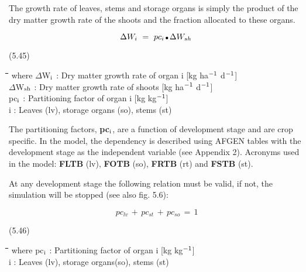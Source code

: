 The growth rate of leaves, stems and storage organs is simply the product of the dry
matter growth rate of the shoots and the fraction allocated to these organs.

\begin{displaymath}
\Delta W _{i} ~=~ pc _{i} \, {\rm \Bullet{0.75ex}}\, \Delta W _{sh} 
\end{displaymath}

 
\strut\hfill (5.45)
\nwln
\begin{tabbing}
\hspace{1.27cm}\=\hspace{1.27cm}\=\hspace{1.27cm}\=\hspace{1.27cm}\=%
\hspace{1.27cm}\=\hspace{1.27cm}\=\hspace{1.27cm}\=\hspace{1.27cm}\=%
\hspace{1.27cm}\=\hspace{1.27cm}\=\kill
where $\Delta$W$_{{\rm i}}$ : Dry matter growth rate of organ i        [kg ha$^{{\rm -1}}$ d$^{{\rm -1}}$]\\
$\Delta$W$_{{\rm sh}}$ : Dry matter growth rate of shoots        [kg ha$^{{\rm -1}}$ d$^{{\rm -1}}$]\\
pc$_{{\rm i}}$ : Partitioning factor of organ i        [kg kg$^{{\rm -1}}$]\\
i : Leaves (lv), storage organs (so), stems (st)
\end{tabbing}

 The partitioning factors, {\bf pc$_{{\rm i}}$}, are a function of development stage and are crop specific. In
the model, the dependency is described using AFGEN tables with the development stage
as the independent variable (see Appendix 2). Acronyms used in the model: {\bf FLTB} (lv),
{\bf FOTB} (so), {\bf FRTB} (rt) and {\bf FSTB} (st).



At any development stage the following relation must be valid, if not, the simulation will
be stopped (see also fig. 5.6):

\begin{displaymath}
\, pc _{lv} \, +\, pc _{st} \, +\, pc _{so} \, =\, 1
\end{displaymath}


\strut\hfill (5.46)
\nwln
\begin{tabbing}
\hspace{1.27cm}\=\hspace{1.27cm}\=\hspace{1.27cm}\=\hspace{1.27cm}\=%
\hspace{1.27cm}\=\hspace{1.27cm}\=\hspace{1.27cm}\=\hspace{1.27cm}\=%
\hspace{1.27cm}\=\hspace{1.27cm}\=\kill
where pc$_{{\rm i}}$ : Partitioning factor of organ i        [kg kg$^{{\rm -1}}$]\\
i : Leaves (lv), storage organs(so), stems (st)
\end{tabbing}


